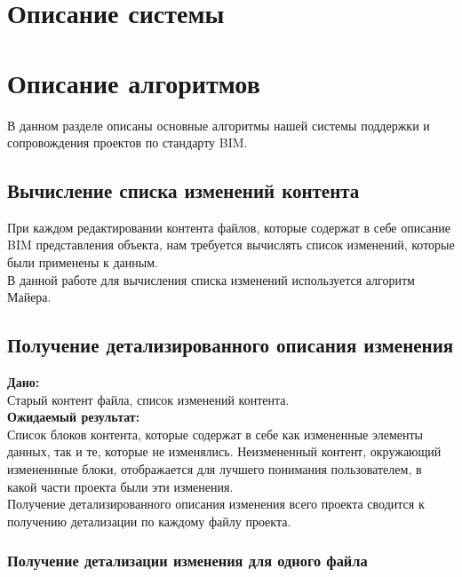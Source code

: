 \documentclass[a4paper,14pt]{extreport} %
\begin{document}
\newpage
\section{Описание системы}


\newpage
\section{Описание алгоритмов}
В данном разделе описаны основные алгоритмы нашей системы поддержки и сопровождения проектов по стандарту BIM.

\subsection{Вычисление списка изменений контента} 
При каждом редактировании контента файлов, которые содержат в себе описание BIM представления объекта, нам требуется вычислять список изменений, которые были применены к данным. \\
В данной работе для вычисления списка изменений используется алгоритм Майера. \\

\newpage
\subsection{Получение детализированного описания изменения} 
\textbf{Дано:} \\
Старый контент файла, список изменений контента. \\
\textbf{Ожидаемый результат:} \\
Список блоков контента, которые содержат в себе как измененные элементы данных, так и те, которые не изменялись. Неизмененный контент, окружающий измененнные блоки, отображается для лучшего понимания пользователем, в какой части проекта были эти изменения. \\
Получение детализированного описания изменения всего проекта сводится к получению детализации по каждому файлу проекта.

\subsubsection{Получение детализации изменения для одного файла}
\end{document}
